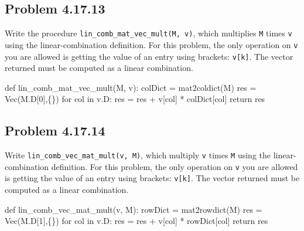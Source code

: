 \documentclass[
  letterpaper,
  DIV=11,
  numbers=noendperiod]{scrartcl}
\newenvironment{Shaded}{\begin{snugshade}}{\end{snugshade}}
\newcommand{\ControlFlowTok}[1]{\textcolor[rgb]{0.00,0.23,0.31}{#1}}
\newcommand{\DecValTok}[1]{\textcolor[rgb]{0.68,0.00,0.00}{#1}}
\newcommand{\KeywordTok}[1]{\textcolor[rgb]{0.00,0.23,0.31}{#1}}
\newcommand{\NormalTok}[1]{\textcolor[rgb]{0.00,0.23,0.31}{#1}}
\newcommand{\OperatorTok}[1]{\textcolor[rgb]{0.37,0.37,0.37}{#1}}
\begin{document}
\hypertarget{problem-4.17.13}{%
\subsection{Problem 4.17.13}\label{problem-4.17.13}}

Write the procedure \texttt{lin\_comb\_mat\_vec\_mult(M,\ v)}, which
multiplies \texttt{M} times \texttt{v} using the linear-combination
definition. For this problem, the only operation on \texttt{v} you are
allowed is getting the value of an entry using brackets:
\texttt{v{[}k{]}}. The vector returned must be computed as a linear
combination.

\begin{Shaded}
\begin{Highlighting}[numbers=left,,]
\KeywordTok{def}\NormalTok{ lin\_comb\_mat\_vec\_mult(M, v):}
\NormalTok{    colDict }\OperatorTok{=}\NormalTok{ mat2coldict(M)}
\NormalTok{    res }\OperatorTok{=}\NormalTok{ Vec(M.D[}\DecValTok{0}\NormalTok{],\{\})}
    \ControlFlowTok{for}\NormalTok{ col }\KeywordTok{in}\NormalTok{ v.D:}
\NormalTok{        res }\OperatorTok{=}\NormalTok{ res }\OperatorTok{+}\NormalTok{ v[col] }\OperatorTok{*}\NormalTok{ colDict[col]}
    \ControlFlowTok{return}\NormalTok{ res}
\end{Highlighting}
\end{Shaded}

\hypertarget{problem-4.17.14}{%
\subsection{Problem 4.17.14}\label{problem-4.17.14}}

Write \texttt{lin\_comb\_vec\_mat\_mult(v,\ M)}, which multiply
\texttt{v} times \texttt{M} using the linear-combination definition. For
this problem, the only operation on \texttt{v} you are allowed is
getting the value of an entry using brackets: \texttt{v{[}k{]}}. The
vector returned must be computed as a linear combination.

\begin{Shaded}
\begin{Highlighting}[numbers=left,,]
\KeywordTok{def}\NormalTok{ lin\_comb\_vec\_mat\_mult(v, M):}
\NormalTok{  rowDict }\OperatorTok{=}\NormalTok{ mat2rowdict(M)}
\NormalTok{  res }\OperatorTok{=}\NormalTok{ Vec(M.D[}\DecValTok{1}\NormalTok{],\{\})}
  \ControlFlowTok{for}\NormalTok{ col }\KeywordTok{in}\NormalTok{ v.D:}
\NormalTok{      res }\OperatorTok{=}\NormalTok{ res }\OperatorTok{+}\NormalTok{ v[col] }\OperatorTok{*}\NormalTok{ rowDict[col]}
  \ControlFlowTok{return}\NormalTok{ res}
\end{Highlighting}
\end{Shaded}
\end{document}
